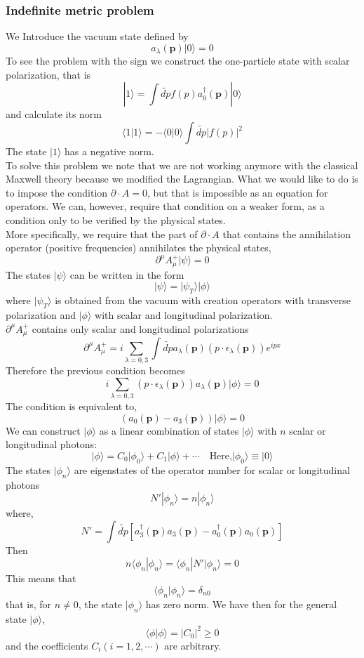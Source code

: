 \documentclass[cyan]{elegantnote}
\begin{document}
\subsubsection{Indefinite metric problem}
We Introduce the vacuum state defined by
\[a_{\lambda}(\bm{p}) | 0 \rangle = 0\]
To see the problem with the sign we construct the one-particle state with scalar polarization, that is
\[|1\rangle = \int \widetilde{dp} f(p) a^{\dagger}_{0}(\bm{p})|0\rangle
\]
and calculate its norm
\[\langle 1 | 1 \rangle = -\langle 0 | 0 \rangle \int \widetilde{dp} |f(p)|^2\]
The state $| 1 \rangle$ has a negative norm.
\\
To solve this problem we note that we are not working anymore with the classical Maxwell theory because we modified the Lagrangian. What we would like to do is to impose the condition $\partial \cdot A = 0$, but that is impossible as an equation for operators. We can, however, require that condition on a weaker form, as a condition only to be verified by the physical states.
\\
More specifically, we require that the part of $\partial \cdot A$ that contains the annihilation operator (positive frequencies) annihilates the physical states,
\[\partial^{\mu} A^{+}_{\mu} | \psi \rangle = 0\]
The states $| \psi \rangle$ can be written in the form
\[| \psi \rangle = | \psi_T \rangle | \phi \rangle\]
where $| \psi_T \rangle$  is obtained from the vacuum with creation operators with transverse polarization and $| \phi \rangle$ with scalar and longitudinal polarization.
\\
$\partial^{\mu} A^{+}_{\mu}$ contains only scalar and longitudinal polarizations
\[\partial^{\mu} A^{+}_{\mu} = i\sum_{\lambda=0,3} \int \widetilde{dp} a_{\lambda}(\bm{p}) (p \cdot \epsilon_{\lambda}(\bm{p}) ) e^{ipx} \]
Therefore the previous condition becomes
\[i\sum_{\lambda=0,3} (p \cdot \epsilon_{\lambda}(\bm{p})) a_{\lambda}(\bm{p})  | \phi \rangle = 0\]
The condition is equivalent to,
\[(a_{0}(\bm{p}) - a_{3}(\bm{p})) | \phi \rangle = 0\]
We can construct $| \phi \rangle$ as a linear combination of states $| \phi \rangle$ with $n$ scalar or longitudinal photons:
\[| \phi \rangle = C_0 | \phi_0 \rangle + C_1 | \phi \rangle + \cdots \quad \mbox{Here,} | \phi_0 \rangle \equiv | 0 \rangle\]
The states $|\phi_n\rangle$ are eigenstates of the operator number for scalar or longitudinal photons
\[N' | \phi_n \rangle = n | \phi_n \rangle\]
where,
\[N' = \int \widetilde{dp} [a^{\dagger}_{3}(\bm{p})a_{3}(\bm{p})-a^{\dagger}_{0}(\bm{p})a_{0}(\bm{p})] \]
Then
\[n \langle \phi_n | \phi_n \rangle = \langle \phi_n |N'| \phi_n \rangle = 0\]
This means that
\[\langle \phi_n | \phi_n \rangle = \delta_{n0}\]
that is, for $n \neq 0$, the state $| \phi_n \rangle$ has zero norm. We have then for the general state $| \phi \rangle$,
\[\langle \phi | \phi \rangle = |C_0|^2 \geq 0\]
and the coefficients $C_i(i=1,2,\cdots)$ are arbitrary.
\end{document}
